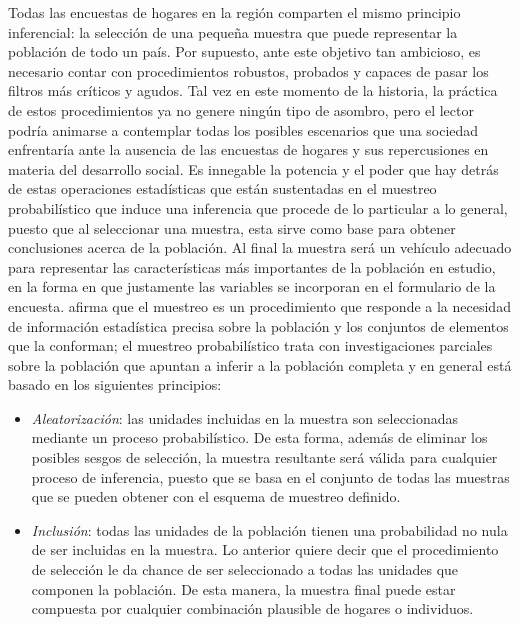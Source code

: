 \documentclass[12pt,spanish,]{book}
\providecommand{\tightlist}{%
  \setlength{\itemsep}{0pt}\setlength{\parskip}{0pt}}
\begin{document}
Todas las encuestas de hogares en la región comparten el mismo principio inferencial: la selección de una pequeña muestra que puede representar la población de todo un país. Por supuesto, ante este objetivo tan ambicioso, es necesario contar con procedimientos robustos, probados y capaces de pasar los filtros más críticos y agudos. Tal vez en este momento de la historia, la práctica de estos procedimientos ya no genere ningún tipo de asombro, pero el lector podría animarse a contemplar todas los posibles escenarios que una sociedad enfrentaría ante la ausencia de las encuestas de hogares y sus repercusiones en materia del desarrollo social. Es innegable la potencia y el poder que hay detrás de estas operaciones estadísticas que están sustentadas en el muestreo probabilístico que induce una inferencia que procede de lo particular a lo general, puesto que al seleccionar una muestra, esta sirve como base para obtener conclusiones acerca de la población. Al final la muestra será un vehículo adecuado para representar las características más importantes de la población en estudio, en la forma en que justamente las variables se incorporan en el formulario de la encuesta. \textcite{Gutierrez_2016} afirma que el muestreo es un procedimiento que responde a la necesidad de información estadística precisa sobre la población y los conjuntos de elementos que la conforman; el muestreo probabilístico trata con investigaciones parciales sobre la población que apuntan a inferir a la población completa y en general está basado en los siguientes principios:

\begin{itemize}
\tightlist
\item
  \emph{Aleatorización}: las unidades incluidas en la muestra son seleccionadas mediante un proceso probabilístico. De esta forma, además de eliminar los posibles sesgos de selección, la muestra resultante será válida para cualquier proceso de inferencia, puesto que se basa en el conjunto de todas las muestras que se pueden obtener con el esquema de muestreo definido.
\item
  \emph{Inclusión}: todas las unidades de la población tienen una probabilidad no nula de ser incluidas en la muestra. Lo anterior quiere decir que el procedimiento de selección le da chance de ser seleccionado a todas las unidades que componen la población. De esta manera, la muestra final puede estar compuesta por cualquier combinación plausible de hogares o individuos.
\end{itemize}
\end{document}
